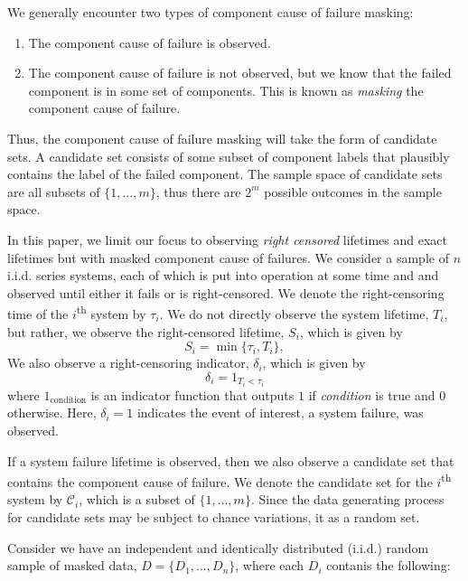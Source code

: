 \documentclass[
]{article}
\providecommand{\tightlist}{%
  \setlength{\itemsep}{0pt}\setlength{\parskip}{0pt}}
\begin{document}
We generally encounter two types of component cause of failure masking:

\begin{enumerate}
\def\labelenumi{\arabic{enumi}.}
\tightlist
\item
  The component cause of failure is observed.
\item
  The component cause of failure is not observed, but we know that the
  failed component is in some set of components. This is known as
  \emph{masking} the component cause of failure.
\end{enumerate}

Thus, the component cause of failure masking will take the form of
candidate sets. A candidate set consists of some subset of component
labels that plausibly contains the label of the failed component. The
sample space of candidate sets are all subsets of \(\{1,\ldots,m\}\),
thus there are \(2^m\) possible outcomes in the sample space.

In this paper, we limit our focus to observing \emph{right censored}
lifetimes and exact lifetimes but with masked component cause of
failures. We consider a sample of \(n\) i.i.d. series systems, each of
which is put into operation at some time and and observed until either
it fails or is right-censored. We denote the right-censoring time of the
\(i\)\textsuperscript{th} system by \(\tau_i\). We do not directly
observe the system lifetime, \(T_i\), but rather, we observe the
right-censored lifetime, \(S_i\), which is given by \begin{equation}
    S_i = \min\{\tau_i, T_i\},
\end{equation} We also observe a right-censoring indicator,
\(\delta_i\), which is given by \begin{equation}
    \delta_i = 1_{T_i < \tau_i}
\end{equation} where \(1_{\text{condition}}\) is an indicator function
that outputs \(1\) if \emph{condition} is true and \(0\) otherwise.
Here, \(\delta_i = 1\) indicates the event of interest, a system
failure, was observed.

If a system failure lifetime is observed, then we also observe a
candidate set that contains the component cause of failure. We denote
the candidate set for the \(i\)\textsuperscript{th} system by
\(\mathcal{C}_i\), which is a subset of \(\{1,\ldots,m\}\). Since the
data generating process for candidate sets may be subject to chance
variations, it as a random set.

Consider we have an independent and identically distributed (i.i.d.)
random sample of masked data, \(D = \{D_1, \ldots, D_n\}\), where each
\(D_i\) contanis the following:
\end{document}
